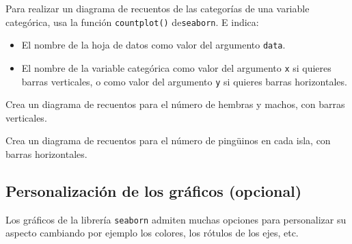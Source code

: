 \documentclass[
  a4paper,
  noprof,
  12pt,
  notoc,
  nosols,
  nobib]{mnye}
\providecommand{\tightlist}{%
  \setlength{\itemsep}{0pt}\setlength{\parskip}{0pt}}\usepackage{longtable,booktabs,array}
\renewenvironment{exercise}[1][]{
            \if\relax\detokenize{#1}\relax
                \ex
            \else
                \ex[note={#1}]
            \fi
        }{\endex}
\theoremstyle{definition}
\newtheorem{exercise}{Ejercicio}[section]
\theoremstyle{remark}
\begin{document}
\begin{tcolorbox}[enhanced jigsaw, arc=.35mm, colback=white, colframe=quarto-callout-note-color-frame, breakable, opacityback=0, bottomrule=.15mm, rightrule=.15mm, left=2mm, toprule=.15mm, leftrule=.75mm]
\begin{minipage}[t]{5.5mm}
\textcolor{quarto-callout-note-color}{\faInfo}
\end{minipage}%
\begin{minipage}[t]{\textwidth - 5.5mm}

Para realizar un diagrama de recuentos de las categorías de una variable
categórica, usa la función \texttt{countplot()} de\texttt{seaborn}. E
indica:

\begin{itemize}
\tightlist
\item
  El nombre de la hoja de datos como valor del argumento \texttt{data}.
\item
  El nombre de la variable categórica como valor del argumento
  \texttt{x} si quieres barras verticales, o como valor del argumento
  \texttt{y} si quieres barras horizontales.
\end{itemize}

\end{minipage}%
\end{tcolorbox}

\begin{exercise}[]%
\protect\hypertarget{exr-1categorial-countplot-vertical}{}\label{exr-1categorial-countplot-vertical}%
Crea un diagrama de recuentos para el número de hembras y machos, con
barras verticales.

\end{exercise}

\begin{exercise}[]%
\protect\hypertarget{exr-1categorial-sns-countplot}{}\label{exr-1categorial-sns-countplot}%
Crea un diagrama de recuentos para el número de pingüinos en cada isla,
con barras horizontales.

\end{exercise}

\hypertarget{personalizaciuxf3n-de-los-gruxe1ficos-opcional}{%
\subsection{Personalización de los gráficos
(opcional)}\label{personalizaciuxf3n-de-los-gruxe1ficos-opcional}}

Los gráficos de la librería \texttt{seaborn} admiten muchas opciones
para personalizar su aspecto cambiando por ejemplo los colores, los
rótulos de los ejes, etc.
\end{document}
